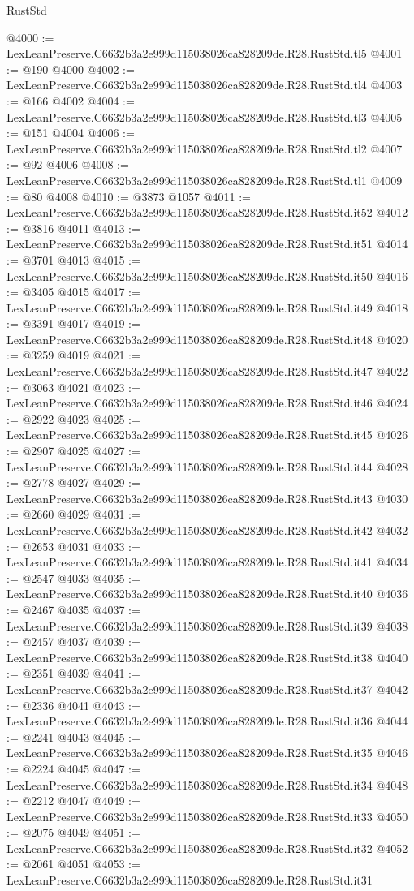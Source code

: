 \begin{lexlean}{RustStd}
\begin{coremodule}
@4000 := LexLeanPreserve.C6632b3a2e999d115038026ca828209de.R28.RustStd.tl5
@4001 := @190 @4000
@4002 := LexLeanPreserve.C6632b3a2e999d115038026ca828209de.R28.RustStd.tl4
@4003 := @166 @4002
@4004 := LexLeanPreserve.C6632b3a2e999d115038026ca828209de.R28.RustStd.tl3
@4005 := @151 @4004
@4006 := LexLeanPreserve.C6632b3a2e999d115038026ca828209de.R28.RustStd.tl2
@4007 := @92 @4006
@4008 := LexLeanPreserve.C6632b3a2e999d115038026ca828209de.R28.RustStd.tl1
@4009 := @80 @4008
@4010 := @3873 @1057
@4011 := LexLeanPreserve.C6632b3a2e999d115038026ca828209de.R28.RustStd.it52
@4012 := @3816 @4011
@4013 := LexLeanPreserve.C6632b3a2e999d115038026ca828209de.R28.RustStd.it51
@4014 := @3701 @4013
@4015 := LexLeanPreserve.C6632b3a2e999d115038026ca828209de.R28.RustStd.it50
@4016 := @3405 @4015
@4017 := LexLeanPreserve.C6632b3a2e999d115038026ca828209de.R28.RustStd.it49
@4018 := @3391 @4017
@4019 := LexLeanPreserve.C6632b3a2e999d115038026ca828209de.R28.RustStd.it48
@4020 := @3259 @4019
@4021 := LexLeanPreserve.C6632b3a2e999d115038026ca828209de.R28.RustStd.it47
@4022 := @3063 @4021
@4023 := LexLeanPreserve.C6632b3a2e999d115038026ca828209de.R28.RustStd.it46
@4024 := @2922 @4023
@4025 := LexLeanPreserve.C6632b3a2e999d115038026ca828209de.R28.RustStd.it45
@4026 := @2907 @4025
@4027 := LexLeanPreserve.C6632b3a2e999d115038026ca828209de.R28.RustStd.it44
@4028 := @2778 @4027
@4029 := LexLeanPreserve.C6632b3a2e999d115038026ca828209de.R28.RustStd.it43
@4030 := @2660 @4029
@4031 := LexLeanPreserve.C6632b3a2e999d115038026ca828209de.R28.RustStd.it42
@4032 := @2653 @4031
@4033 := LexLeanPreserve.C6632b3a2e999d115038026ca828209de.R28.RustStd.it41
@4034 := @2547 @4033
@4035 := LexLeanPreserve.C6632b3a2e999d115038026ca828209de.R28.RustStd.it40
@4036 := @2467 @4035
@4037 := LexLeanPreserve.C6632b3a2e999d115038026ca828209de.R28.RustStd.it39
@4038 := @2457 @4037
@4039 := LexLeanPreserve.C6632b3a2e999d115038026ca828209de.R28.RustStd.it38
@4040 := @2351 @4039
@4041 := LexLeanPreserve.C6632b3a2e999d115038026ca828209de.R28.RustStd.it37
@4042 := @2336 @4041
@4043 := LexLeanPreserve.C6632b3a2e999d115038026ca828209de.R28.RustStd.it36
@4044 := @2241 @4043
@4045 := LexLeanPreserve.C6632b3a2e999d115038026ca828209de.R28.RustStd.it35
@4046 := @2224 @4045
@4047 := LexLeanPreserve.C6632b3a2e999d115038026ca828209de.R28.RustStd.it34
@4048 := @2212 @4047
@4049 := LexLeanPreserve.C6632b3a2e999d115038026ca828209de.R28.RustStd.it33
@4050 := @2075 @4049
@4051 := LexLeanPreserve.C6632b3a2e999d115038026ca828209de.R28.RustStd.it32
@4052 := @2061 @4051
@4053 := LexLeanPreserve.C6632b3a2e999d115038026ca828209de.R28.RustStd.it31

\end{coremodule}
\end{lexlean}
